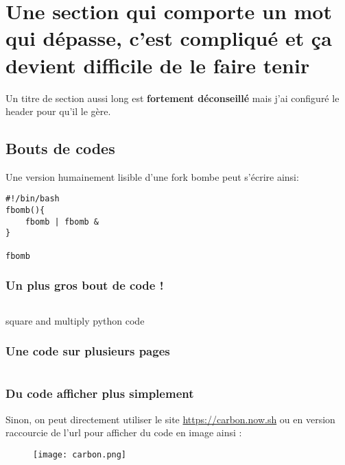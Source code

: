 \section{Une section qui comporte un mot qui dépasse, c'est compliqué et ça devient difficile de le faire tenir}
Un titre de section aussi long est \textbf{fortement déconseillé} mais j'ai configuré le header pour qu'il le gère.

\subsection{Bouts de codes}
Une version humainement lisible d'une fork bombe peut s'écrire ainsi:
\begin{verbatim}
#!/bin/bash
fbomb(){
    fbomb | fbomb &
}

fbomb
\end{verbatim}

\subsubsection{Un plus gros bout de code !}
\begin{listing}[H]
    \inputminted{python}{src/parts/code/example.py}
    \caption{square and multiply python code}
    \label{cd:square_and_mult}
\end{listing}

\subsubsection{Une code sur plusieurs pages}

\inputminted{python}{src/parts/code/example2.py}


\subsubsection{Du code afficher plus simplement}

Sinon, on peut directement utiliser le site \url{https://carbon.now.sh} ou en version raccourcie de l'url  pour afficher du code en image ainsi :
\begin{figure}[H]
    \centering
    \texttt{[image: carbon.png]}
\end{figure}

